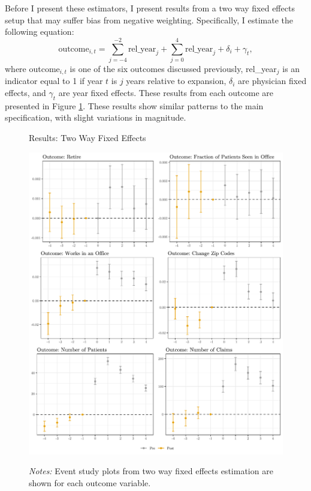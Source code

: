 \documentclass[11pt]{article}
\begin{document}
Before I present these estimators, I present results from a two way fixed effects setup that may suffer bias from negative weighting. Specifically, I estimate the following equation:
$$\text{outcome}_{i,t}=\sum_{j=-4}^{-2} \text{rel\_year}_{j} + \sum_{j=0}^{4} \text{rel\_year}_{j} + \delta_i + \gamma_t,$$
where outcome$_{i,t}$ is one of the six outcomes discussed previously, rel\_year$_j$ is an indicator equal to 1 if year $t$ is $j$ years relative to expansion, $\delta_i$ are physician fixed effects, and $\gamma_t$ are year fixed effects.
These results from each outcome are presented in Figure \ref{fig:twfe}. These results show similar patterns to the main specification, with slight variations in magnitude. 

\begin{figure}
    \centering
    \captionsetup{width=.8\linewidth}
    \caption{Results: Two Way Fixed Effects}
    \includegraphics[scale=.8]{Objects/twfe_plot.pdf}
    \label{fig:twfe}
    \vspace{2mm}
    \caption*{\footnotesize{\textit{Notes:} Event study plots from two way fixed effects estimation are shown for each outcome variable.}}
\end{figure}
\end{document}
